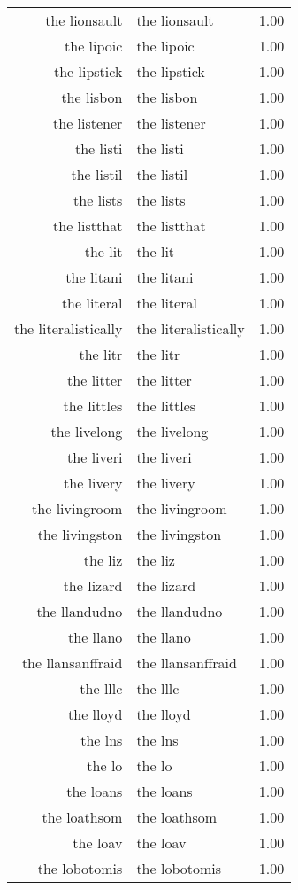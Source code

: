 \begin{table}[ht]
\begin{tabular}{rlr}
  the lionsault & the lionsault & 1.00 \\ 
  the lipoic & the lipoic & 1.00 \\ 
  the lipstick & the lipstick & 1.00 \\ 
  the lisbon & the lisbon & 1.00 \\ 
  the listener & the listener & 1.00 \\ 
  the listi & the listi & 1.00 \\ 
  the listil & the listil & 1.00 \\ 
  the lists & the lists & 1.00 \\ 
  the listthat & the listthat & 1.00 \\ 
  the lit & the lit & 1.00 \\ 
  the litani & the litani & 1.00 \\ 
  the literal & the literal & 1.00 \\ 
  the literalistically & the literalistically & 1.00 \\ 
  the litr & the litr & 1.00 \\ 
  the litter & the litter & 1.00 \\ 
  the littles & the littles & 1.00 \\ 
  the livelong & the livelong & 1.00 \\ 
  the liveri & the liveri & 1.00 \\ 
  the livery & the livery & 1.00 \\ 
  the livingroom & the livingroom & 1.00 \\ 
  the livingston & the livingston & 1.00 \\ 
  the liz & the liz & 1.00 \\ 
  the lizard & the lizard & 1.00 \\ 
  the llandudno & the llandudno & 1.00 \\ 
  the llano & the llano & 1.00 \\ 
  the llansanffraid & the llansanffraid & 1.00 \\ 
  the lllc & the lllc & 1.00 \\ 
  the lloyd & the lloyd & 1.00 \\ 
  the lns & the lns & 1.00 \\ 
  the lo & the lo & 1.00 \\ 
  the loans & the loans & 1.00 \\ 
  the loathsom & the loathsom & 1.00 \\ 
  the loav & the loav & 1.00 \\ 
  the lobotomis & the lobotomis & 1.00 \\ 

\end{tabular}
\end{table}
